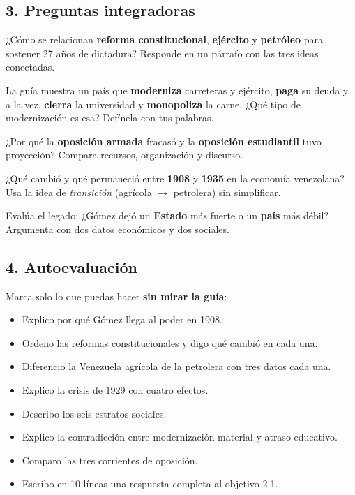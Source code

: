 \documentclass[12pt, letterpaper]{article}
\begin{document}
\subsection*{3. Preguntas integradoras}
\begin{preguntas}
  \item \muyDificil{} ¿Cómo se relacionan \textbf{reforma constitucional},
        \textbf{ejército} y \textbf{petróleo} para sostener 27 años de
        dictadura? Responde en un párrafo con las tres ideas conectadas.
  \item \muyDificil{} La guía muestra un país que \textbf{moderniza} carreteras y
        ejército, \textbf{paga} su deuda y, a la vez, \textbf{cierra} la
        universidad y \textbf{monopoliza} la carne. ¿Qué tipo de modernización
        es esa? Defínela con tus palabras.
  \item \muyDificil{} ¿Por qué la \textbf{oposición armada} fracasó y la
        \textbf{oposición estudiantil} tuvo proyección? Compara recursos,
        organización y discurso.
  \item \muyDificil{} ¿Qué cambió y qué permaneció entre \textbf{1908} y
        \textbf{1935} en la economía venezolana? Usa la idea de
        \textit{transición} (agrícola $\rightarrow$ petrolera) sin simplificar.
  \item \muyDificil{} Evalúa el legado: ¿Gómez dejó un \textbf{Estado} más fuerte o
        un \textbf{país} más débil? Argumenta con dos datos económicos y dos
        sociales.
\end{preguntas}

\subsection*{4. Autoevaluación}
\noindent\small
Marca \textbf{\checkmark} solo lo que puedas hacer \textbf{sin mirar la guía}:

\begin{itemize}[leftmargin=*, itemsep=2pt, label=$\square$]
  \item Explico por qué Gómez llega al poder en 1908.
  \item Ordeno las reformas constitucionales y digo qué cambió en cada una.
  \item Diferencio la Venezuela agrícola de la petrolera con tres datos cada una.
  \item Explico la crisis de 1929 con cuatro efectos.
  \item Describo los seis estratos sociales.
  \item Explico la contradicción entre modernización material y atraso educativo.
  \item Comparo las tres corrientes de oposición.
  \item Escribo en 10 líneas una respuesta completa al objetivo 2.1.
\end{itemize}
\end{document}
